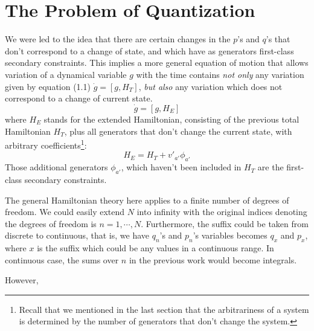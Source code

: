 \documentclass[12pt]{article}
\numberwithin{equation}{section}
\begin{document}
\section{The Problem of Quantization}
We were led to the idea that there are certain changes in the $p$'s and $q$'s that don't correspond to a change of state, and which have as generators first-class secondary constraints.
This implies a more general equation of motion that allows variation of a dynamical variable $g$ with the time contains \textit{not only} any variation given by equation (1.1) $\dot{g} = [g, H_{T}]$, \textit{but also} any variation which does not correspond to a change of current state.
\begin{equation}
    \dot{g} = \left[g, H_{E}\right]
\end{equation}
where $H_{E}$ stands for the extended Hamiltonian, consisting of the previous total Hamiltonian $H_{T}$, plus all generators that don't change the current state, with arbitrary coefficients\footnote{Recall that we mentioned in the last section that the arbitrariness of a system is determined by the number of generators that don't change the system.}:
\begin{equation}
    H_{E} = H_{T} + v'_{a'}\phi_{a'}
\end{equation}
Those additional generators $\phi_{a'}$, which haven't been included in $H_{T}$ are the first-class secondary constraints.

The general Hamiltonian theory here applies to a finite number of degrees of freedom.
We could easily extend $N$ into infinity with the original indices denoting the degrees of freedom is $n = 1,\cdots, N$.
Furthermore, the suffix could be taken from discrete to continuous, that is, we have $q_{n}$'s and $p_{n}$'s variables becomes $q_{x}$ and $p_{x}$, where $x$ is the suffix which could be any values in a continuous range.
In continuous case, the sums over $n$ in the previous work would become integrals.

However,
\end{document}

